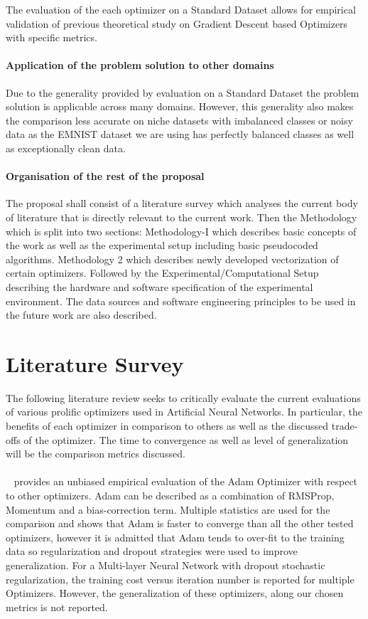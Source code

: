 \documentclass{article}
\begin{document}
	The evaluation of the each optimizer on a Standard Dataset allows for empirical validation of previous theoretical study on Gradient Descent based Optimizers with specific metrics.
	\paragraph{Application of the problem solution to other domains}
	
	Due to the generality provided by evaluation on a Standard Dataset the problem solution is applicable across many domains. However, this generality also makes the comparison less accurate on niche datasets with imbalanced classes or noisy data as the EMNIST dataset we are using has perfectly balanced classes as well as exceptionally clean data. 
	
	
	\paragraph{Organisation of the rest of the proposal}
	
	The proposal shall consist of a literature survey which analyses the current body of literature that is directly relevant to the current work. Then the Methodology which is split into two sections:
	Methodology-I which describes basic concepts of the work as well as the experimental setup including basic pseudocoded algorithms. Methodology 2 which describes newly developed vectorization of certain optimizers. Followed by the Experimental/Computational Setup describing the hardware and software specification of the experimental environment. The data sources and software engineering principles to be used in the future work are also described.
	
	
\section{Literature Survey}	
The following literature review seeks to critically evaluate the current evaluations of various prolific optimizers used in Artificial Neural Networks. In particular, the benefits of each optimizer in comparison to others as well as the discussed trade-offs of the optimizer. The time to convergence as well as level of generalization will be the comparison metrics discussed.


\paragraph{}~\citet{kingma2014adam} provides an unbiased empirical evaluation of the Adam Optimizer with respect to other optimizers. Adam can be described as a combination of RMSProp, Momentum and a bias-correction term.
Multiple statistics are used for the comparison and shows that Adam is faster to converge than all the other tested optimizers, however it is admitted that Adam tends to over-fit to the training data so regularization and dropout strategies were used to improve generalization. For a Multi-layer Neural Network with dropout stochastic regularization, the training cost versus iteration number is reported for multiple Optimizers. However, the generalization of these optimizers, along our chosen metrics is not reported.
\end{document}
